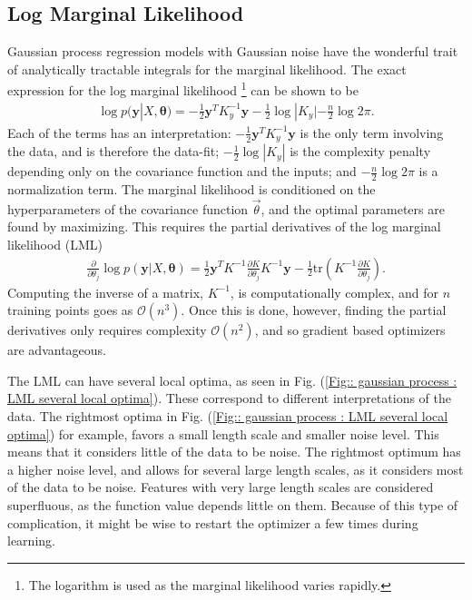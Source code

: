 \documentclass[twoside,english]{uiofysmaster}
\begin{document}

\subsection{Log Marginal Likelihood}

Gaussian process regression models with Gaussian noise have the wonderful trait of analytically tractable integrals for the marginal likelihood. The exact expression for the log marginal likelihood \footnote{The logarithm is used as the marginal likelihood varies rapidly.} can be shown to be \cite{rasmussen2006gaussian}
\begin{align}
\log p(\textbf{y}|X, \boldsymbol{\theta}) = - \frac{1}{2} \textbf{y}^T K_y^{-1} \textbf{y} - \frac{1}{2} \log |K_y| - \frac{n}{2} \log 2 \pi.
\end{align}
Each of the terms has an interpretation: $- \frac{1}{2} \textbf{y}^T K_y^{-1} \textbf{y}$ is the only term involving the data, and is therefore the data-fit; $-\frac{1}{2} \log |K_y|$ is the complexity penalty depending only on the covariance function and the inputs; and $- \frac{n}{2} \log 2 \pi$ is a normalization term. The marginal likelihood is conditioned on the hyperparameters of the covariance function $\vec{\theta}$, and the optimal parameters are found by maximizing. This requires the partial derivatives of the log marginal likelihood (LML)
\begin{align}
\frac{\partial}{\partial \theta_j}
 \log p(\textbf{y}|X, \boldsymbol{\theta}) = \frac{1}{2} \textbf{y}^T K^{-1} \frac{\partial K}{\partial \theta_j} K^{-1} \textbf{y} - \frac{1}{2} \text{tr} (K^{-1} \frac{\partial K}{\partial \theta_j}).
\end{align}
Computing the inverse of a matrix, $K^{-1}$, is computationally complex, and for $n$ training points goes as $\mathcal{O}(n^3)$. Once this is done, however, finding the partial derivatives only requires complexity $\mathcal{O}(n^2)$, and so gradient based optimizers are advantageous.

The LML can have several local optima, as seen in Fig. (\ref{Fig:: gaussian process : LML several local optima}). These correspond to different interpretations of the data. The rightmost optima in Fig. (\ref{Fig:: gaussian process : LML several local optima}) for example, favors a small length scale and smaller noise level. This means that it considers little of the data to be noise. The rightmost optimum has a higher noise level, and allows for several large length scales, as it considers most of the data to be noise. Features with very large length scales are considered superfluous, as the function value depends little on them. Because of this type of complication, it might be wise to restart the optimizer a few times during learning.
\end{document}
